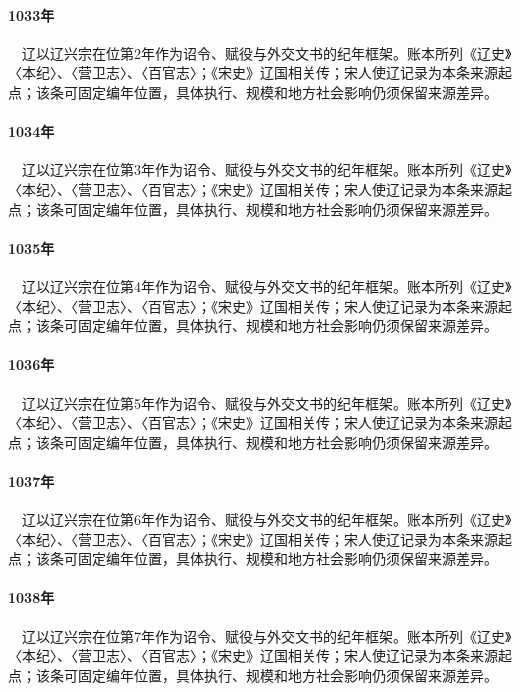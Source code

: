\paragraph{1033年}　辽以辽兴宗在位第2年作为诏令、赋役与外交文书的纪年框架。账本所列《辽史》〈本纪〉、〈营卫志〉、〈百官志〉；《宋史》辽国相关传；宋人使辽记录为本条来源起点；该条可固定编年位置，具体执行、规模和地方社会影响仍须保留来源差异。

\paragraph{1034年}　辽以辽兴宗在位第3年作为诏令、赋役与外交文书的纪年框架。账本所列《辽史》〈本纪〉、〈营卫志〉、〈百官志〉；《宋史》辽国相关传；宋人使辽记录为本条来源起点；该条可固定编年位置，具体执行、规模和地方社会影响仍须保留来源差异。

\paragraph{1035年}　辽以辽兴宗在位第4年作为诏令、赋役与外交文书的纪年框架。账本所列《辽史》〈本纪〉、〈营卫志〉、〈百官志〉；《宋史》辽国相关传；宋人使辽记录为本条来源起点；该条可固定编年位置，具体执行、规模和地方社会影响仍须保留来源差异。

\paragraph{1036年}　辽以辽兴宗在位第5年作为诏令、赋役与外交文书的纪年框架。账本所列《辽史》〈本纪〉、〈营卫志〉、〈百官志〉；《宋史》辽国相关传；宋人使辽记录为本条来源起点；该条可固定编年位置，具体执行、规模和地方社会影响仍须保留来源差异。

\paragraph{1037年}　辽以辽兴宗在位第6年作为诏令、赋役与外交文书的纪年框架。账本所列《辽史》〈本纪〉、〈营卫志〉、〈百官志〉；《宋史》辽国相关传；宋人使辽记录为本条来源起点；该条可固定编年位置，具体执行、规模和地方社会影响仍须保留来源差异。

\paragraph{1038年}　辽以辽兴宗在位第7年作为诏令、赋役与外交文书的纪年框架。账本所列《辽史》〈本纪〉、〈营卫志〉、〈百官志〉；《宋史》辽国相关传；宋人使辽记录为本条来源起点；该条可固定编年位置，具体执行、规模和地方社会影响仍须保留来源差异。

